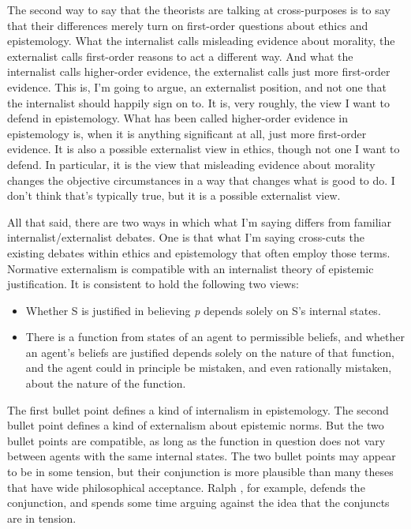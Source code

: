 The second way to say that the theorists are talking at cross-purposes is to say that their differences merely turn on first-order questions about ethics and epistemology. What the internalist calls misleading evidence about morality, the externalist calls first-order reasons to act a different way. And what the internalist calls higher-order evidence, the externalist calls just more first-order evidence. This is, I'm going to argue, an externalist position, and not one that the internalist should happily sign on to. It is, very roughly, the view I want to defend in epistemology. What has been called higher-order evidence in epistemology is, when it is anything significant at all, just more first-order evidence. It is also a possible externalist view in ethics, though not one I want to defend. In particular, it is the view that misleading evidence about morality changes the objective circumstances in a way that changes what is good to do. I don't think that's typically true, but it is a possible externalist view.

All that said, there are two ways in which what I'm saying differs from familiar internalist\slash externalist debates. One is that what I'm saying cross-cuts the existing debates within ethics and epistemology that often employ those terms. Normative externalism is compatible with an internalist theory of epistemic justification. It is consistent to hold the following two views:

\begin{itemize}
\item{} Whether S is justified in believing \emph{p} depends solely on S's internal states.

\item{} There is a function from states of an agent to permissible beliefs, and whether an agent's beliefs are justified depends solely on the nature of that function, and the agent could in principle be mistaken, and even rationally mistaken, about the nature of the function.

\end{itemize}
The first bullet point defines a kind of internalism in epistemology. The second bullet point defines a kind of externalism about epistemic norms. But the two bullet points are compatible, as long as the function in question does not vary between agents with the same internal states. The two bullet points may appear to be in some tension, but their conjunction is more plausible than many theses that have wide philosophical acceptance. Ralph \citet{Wedgwood2012}, for example, defends the conjunction, and spends some time arguing against the idea that the conjuncts are in tension.

